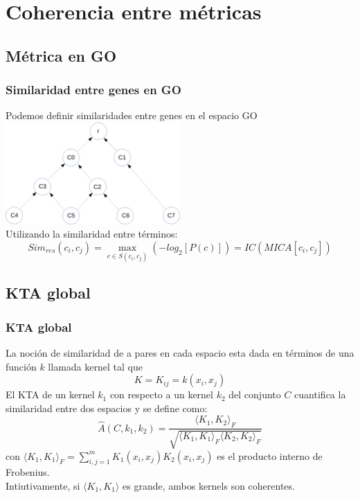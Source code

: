 \documentclass[serif,9pt, t]{beamer}
\begin{document}
\section{Coherencia entre métricas}

\subsection{Métrica en GO}
\begin{frame}\frametitle{Similaridad entre genes en GO}
\centering
Podemos definir similaridades entre genes en el espacio GO\\
\bigskip
\includegraphics[width=0.5\textwidth]{dag.pdf}
\\\bigskip
Utilizando la similaridad entre términos:
\begin{equation}
	Sim_{res}(c_i, c_j) = \max\limits_{c \in S(c_i, c_j)}(-log_2[P(c)]) = IC(MICA[c_i, c_j])
\end{equation}
\end{frame}

\subsection{KTA global}
\begin{frame}\frametitle{KTA global} 
La noción de similaridad de a pares en cada espacio esta dada en términos de una función $k$ llamada kernel tal que
\begin{equation}
	K = K_{ij} = k(x_i, x_j)
\end{equation}
\bigskip
El KTA de un kernel $k_1$ con respecto a un kernel $k_2$ del conjunto $C$ cuantifica la similaridad entre dos espacios y se define como:
\begin{equation}
	\hat{A}(C, k_1, k_2) = \frac{\langle K_1, K_2 \rangle _F}{\sqrt{\langle K_1, K_1 \rangle _F \langle K_2, K_2 \rangle _F}}
\end{equation}
con $\langle K_1, K_1 \rangle _F = \sum_{i,j=1}^m K_1(x_i, x_j)K_2(x_i, x_j)$ es el producto interno de Frobenius.\\
Intiutivamente, si $\langle K_1, K_1 \rangle$ es grande, ambos kernels son coherentes.
\end{frame}
\end{document}
